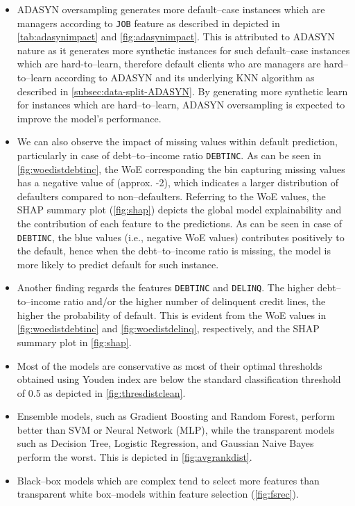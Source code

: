 \begin{itemize}\setlength\itemsep{0em}
    \item ADASYN oversampling generates more default--case instances which are managers according to \texttt{JOB} feature as described in depicted in \autoref{tab:adasynimpact} and \autoref{fig:adasynimpact}.
    This is attributed to ADASYN nature as it generates more synthetic instances for such default--case instances which are hard-to--learn, therefore default clients who are managers are hard--to--learn according to ADASYN and its underlying KNN algorithm as described in \autoref{subsec:data-split-ADASYN}. By generating more synthetic learn for instances which are hard--to--learn, ADASYN oversampling is expected to improve the model's performance.
    \item We can also observe the impact of missing values within default prediction, particularly in case of debt--to--income ratio \texttt{DEBTINC}. As can be seen in \autoref{fig:woedistdebtinc}, the WoE corresponding the bin capturing missing values has a negative value of (approx. -2), which indicates a larger distribution of defaulters compared to non--defaulters.
    Referring to the WoE values, the SHAP summary plot (\autoref{fig:shap}) depicts the global model explainability and the contribution of each feature to the predictions. As can be seen in case of \texttt{DEBTINC}, the blue values (i.e., negative WoE values) contributes positively to the default, hence when the debt--to--income ratio is missing, the model is more likely to predict default for such instance.
    \item Another finding regards the features \texttt{DEBTINC} and \texttt{DELINQ}. The higher debt--to--income ratio and/or the higher number of delinquent credit lines, the higher the probability of default. This is evident from the WoE values in \autoref{fig:woedistdebtinc} and \autoref{fig:woedistdelinq}, respectively, and the SHAP summary plot in \autoref{fig:shap}.
    \item Most of the models are conservative as most of their optimal thresholds obtained using Youden index are below the standard classification threshold of 0.5 as depicted in \autoref{fig:thresdistclean}.
    \item Ensemble models, such as Gradient Boosting and Random Forest, perform better than SVM or Neural Network (MLP), while the transparent models such as Decision Tree, Logistic Regression, and Gaussian Naive Bayes perform the worst. This is depicted in \autoref{fig:avgrankdist}.
    \item Black--box models which are complex tend to select more features than transparent white box--models within feature selection (\autoref{fig:fsrec}).
\end{itemize}
